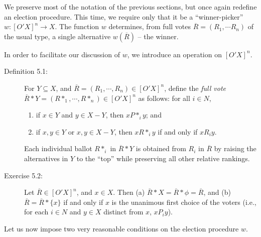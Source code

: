 \documentclass{article}
\begin{document}
We preserve most of the notation of the previous sections, but once again redefine an election procedure. This time, we require only that it be a ``winner-picker'' $w: [O'X]^{n} \rightarrow X$. The function $w$ determines, from full votes $\overline{R} = (R_{1}, \cdots R_{n})$ of the usual type, a single alternative $w(\overline{R})$ -- the winner.

In order to facilitate our discussion of $w$, we introduce an operation on $[O'X]^{n}$.

\begin{description}

\item[Definition 5.1:] For $Y \subseteq X$, and $\overline{R} = (R_{1},\cdots,R_{n}) \in [O'X]^{n}$, define the \emph{full vote} $\overline{R}*Y = (R*_{1},\cdots,R*_{n}) \in [O'X]^{n}$ as follows: for all $i \in N$,
  \begin{enumerate}[\hspace{1cm}(a)]
    \item if $x \in Y$ and $y \in X-Y$, then $xP*_{i}y$; and 
    \item if $x,y \in Y$ or $x,y \in X-Y$, then $xR*_{i}y$ if and only if $xR_{i}y$.
  \end{enumerate}
  Each individual ballot $R*_{i}$ in $\overline{R}*Y$ is obtained from $R_{i}$ in $\overline{R}$ by raising the alternatives in $Y$ to the ``top'' while preserving all other relative rankings.

\item[Exercise 5.2:] Let $\overline{R} \in [O'X]^{n}$, and $x \in X$. Then (a) $\overline{R}*X = \overline{R}*\phi = \overline{R}$, and (b) $\overline{R} = \overline{R}* \{ x \}$ if and only if $x$ is the unanimous first choice of the voters (i.e., for each $i \in N$ and $y \in X$ distinct from $x$, $xP_{i}y$).

\end{description}

Let us now impose two very reasonable conditions on the election procedure $w$.
\end{document}
